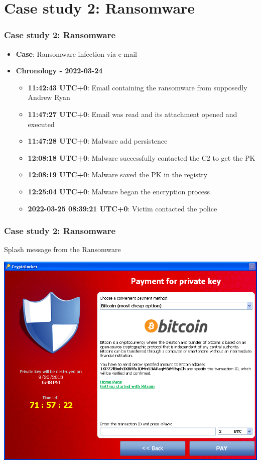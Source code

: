 %
%
%
%

\section{Case study 2: Ransomware}
\begin{frame}
    \frametitle{Case study 2: Ransomware}
    \begin{itemize}
        \item[] \textbf{Case}: Ransomware infection via e-mail
        \item[] \textbf{Chronology - 2022-03-24}
        \begin{itemize}
            \item[] \textbf{\small 11:42:43 UTC+0}: Email containing the ransomware from supposedly Andrew Ryan
            \item[] \textbf{\small 11:47:27 UTC+0}: Email was read and its attachment opened and executed
            \item[] \textbf{\small 11:47:28 UTC+0}: Malware add persistence
            \item[] \textbf{\small 12:08:18 UTC+0}: Malware successfully contacted the C2 to get the PK 
            \item[] \textbf{\small 12:08:19 UTC+0}: Malware saved the PK in the registry
            \item[] \textbf{\small 12:25:04 UTC+0}: Malware began the encryption process
            \item[] \textbf{\small 2022-03-25 08:39:21 UTC+0}: Victim contacted the police
        \end{itemize}
    \end{itemize}
\end{frame}

\begin{frame}
    \frametitle{Case study 2: Ransomware}
    Splash message from the Ransomware
    \begin{center}
        \includegraphics[width=0.8\linewidth]{./pictures/case2/ransom-btc.png}
    \end{center}
\end{frame}

